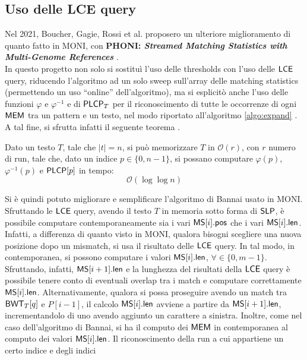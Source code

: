 \subsection{Uso delle LCE query}
Nel 2021, Boucher, Gagie, Rossi et al. proposero un ulteriore miglioramento di
quanto fatto in MONI, con \textbf{PHONI: \textit{Streamed Matching
    Statistics with Multi-Genome References}} \cite{phoni}.\\
In questo progetto non solo si sostituì l'uso delle thresholds con
l'uso delle $\mbox{\rm {\sf LCE}}$ query, riducendo l'algoritmo ad un solo sweep
sull'array delle matching statistics (permettendo un uso ``online''
dell'algoritmo), ma si 
esplicitò anche l'uso delle funzioni $\varphi$ e
$\varphi^{-1}$ e di $\mbox{\rm {\sf PLCP}}_T$ per il riconoscimento di tutte le
occorrenze di ogni $\mbox{\rm {\sf MEM}}$ tra un pattern e un testo, nel modo 
riportato all'algoritmo \ref{algo:expand} \cite{phoni}.\\
A tal fine, si sfrutta infatti il seguente teorema \cite{gagie2020}.
\begin{teorema}
  Dato un testo $T$, tale che $|t|=n$, si può memorizzare $T$ in
  $\mathcal{O}(r)$, con $r$ numero di run, tale che, dato un indice
  $p\in\{0,n-1\}$, si possano computare $\varphi(p)$, $\varphi^{-1}(p)$ e
  $\mbox{\rm {\sf PLCP}}[p]$ in tempo:
  \begin{equation}
    \label{eq:rlpbwt9}
    \mathcal{O}(\log\log n)
  \end{equation}
\end{teorema}
Si è quindi potuto migliorare e semplificare l'algoritmo di Bannai
usato in MONI. Sfruttando le
$\mbox{\rm {\sf LCE}}$ query, avendo il testo $T$ in memoria sotto forma di $\mbox{\rm {\sf SLP}}$,
è possibile computare contemporaneamente sia i vari
$\mbox{\rm {\sf MS}}[i].\mbox{\rm {\sf pos}}$ che i vari $\mbox{\rm {\sf MS}}[i].\mbox{\rm {\sf len}}$. Infatti, a differenza di quanto visto in
MONI, qualora bisogni scegliere una nuova posizione dopo un mismatch, 
si usa il 
risultato delle $\mbox{\rm {\sf LCE}}$ query. In tal modo, in contemporanea,
si possono computare i valori 
$\mbox{\rm {\sf MS}}[i].\mbox{\rm {\sf len}}$, $\forall \in \{0,m-1\}$. Sfruttando, infatti, $\mbox{\rm {\sf MS}}[i+1].\mbox{\rm {\sf len}}$ e
la lunghezza del risultati 
della $\mbox{\rm {\sf LCE}}$ query è possibile tenere conto di eventuali overlap tra i
match e computare correttamente $\mbox{\rm {\sf MS}}[i].\mbox{\rm {\sf len}}$. Alternativamente, qualora si possa
proseguire avendo un match tra  
$\mbox{\rm {\sf BWT}}_T[q]$ e $P[i-1]$, il calcolo $\mbox{\rm {\sf MS}}[i].\mbox{\rm {\sf len}}$ avviene a partire da
$\mbox{\rm {\sf MS}}[i+1].\mbox{\rm {\sf len}}$, incrementandolo di uno avendo aggiunto un carattere a sinistra.
Inoltre, come nel caso dell'algoritmo
di Bannai, si ha il computo dei $\mbox{\rm {\sf MEM}}$ in contemporanea al computo dei valori 
$\mbox{\rm {\sf MS}}[i].\mbox{\rm {\sf len}}$.
Il riconoscimento della run a cui appartiene un certo indice e degli indici
